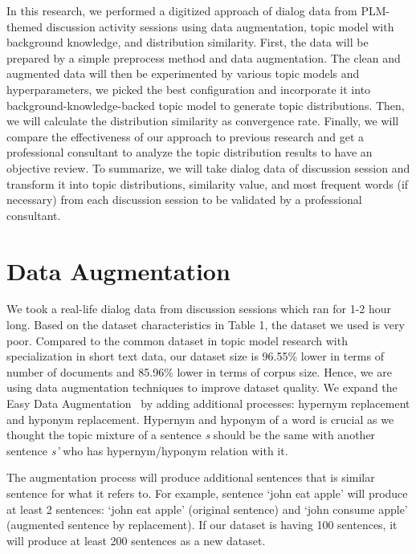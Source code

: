 \documentclass[senior]{IPSstyle}
\begin{document}
In this research, we performed a digitized approach of dialog data from PLM-themed discussion activity sessions using data augmentation, topic model with background knowledge, and distribution similarity. First, the data will be prepared by a simple preprocess method and data augmentation. The clean and augmented data will then be experimented by various topic models and hyperparameters, we picked the best configuration and incorporate it into background-knowledge-backed topic model to generate topic distributions. Then, we will calculate the distribution similarity as convergence rate. Finally, we will compare the effectiveness of our approach to previous research and get a professional consultant to analyze the topic distribution results to have an objective review. To summarize, we will take dialog data of discussion session and transform it into topic distributions, similarity value, and most frequent words (if necessary) from each discussion session to be validated by a professional consultant.

\section{Data Augmentation}

We took a real-life dialog data from discussion sessions which ran for 1-2 hour long. Based on the dataset characteristics in Table 1, the dataset we used is very poor. Compared to the common dataset in topic model research with specialization in short text data, our dataset size is 96.55\% lower in terms of number of documents and 85.96\% lower in terms of corpus size. Hence, we are using data augmentation techniques to improve dataset quality. We expand the Easy Data Augmentation~\cite{wei} by adding additional processes: hypernym replacement and hyponym replacement. Hypernym and hyponym of a word is crucial as we thought the topic mixture of a sentence \textit{s} should be the same with another sentence \textit{s’} who has hypernym/hyponym relation with it.

The augmentation process will produce additional sentences that is similar sentence for what it refers to. For example, sentence ‘john eat apple’ will produce at least 2 sentences: ‘john eat apple’ (original sentence) and ‘john consume apple’ (augmented sentence by replacement). If our dataset is having 100 sentences, it will produce at least 200 sentences as a new dataset.
\end{document}
